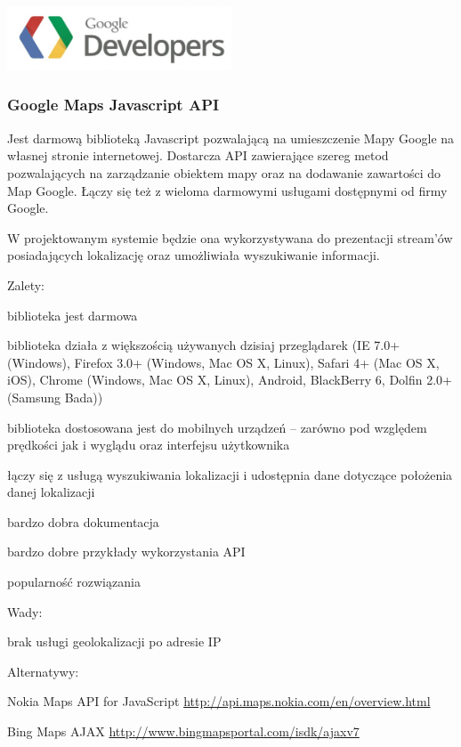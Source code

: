 \begin{minipage}{\textwidth}
    \begin{center}
        \includegraphics[width=0.5\textwidth]{img/logos/google-maps-api.jpg}
    \end{center}
    \subsubsection{Google Maps Javascript API}
    Jest darmową biblioteką Javascript pozwalającą na umieszczenie Mapy Google na własnej stronie internetowej. Dostarcza API zawierające szereg metod pozwalających na zarządzanie obiektem mapy oraz na dodawanie zawartości do Map Google. Łączy się też z wieloma darmowymi usługami dostępnymi od firmy Google.
    
    W projektowanym systemie będzie ona wykorzystywana do prezentacji stream'ów posiadających lokalizację oraz umożliwiała wyszukiwanie informacji.

    Zalety:
    \begin{packed_item}
        \item{biblioteka jest darmowa}
        \item{biblioteka działa z większością używanych dzisiaj przeglądarek (IE 7.0+ (Windows), Firefox 3.0+ (Windows, Mac OS X, Linux), Safari 4+ (Mac OS X, iOS), Chrome (Windows, Mac OS X, Linux), Android, BlackBerry 6, Dolfin 2.0+ (Samsung Bada))}
        \item{biblioteka dostosowana jest do mobilnych urządzeń -- zarówno pod względem prędkości jak i wyglądu oraz interfejsu użytkownika}
        \item{łączy się z usługą wyszukiwania lokalizacji i udostępnia dane dotyczące położenia danej lokalizacji}
        \item{bardzo dobra dokumentacja}
        \item{bardzo dobre przykłady wykorzystania API}
        \item{popularność rozwiązania}
    \end{packed_item}

    Wady:
    \begin{packed_item}
        \item{brak usługi geolokalizacji po adresie IP}
    \end{packed_item}

    Alternatywy:
    \begin{packed_item}
        \item{Nokia Maps API for JavaScript \url{http://api.maps.nokia.com/en/overview.html}}
        \item{Bing Maps AJAX \url{http://www.bingmapsportal.com/isdk/ajaxv7}}
    \end{packed_item}
\end{minipage}

